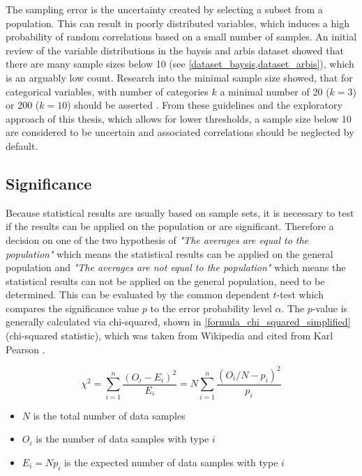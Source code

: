 The sampling error is the uncertainty created by selecting a subset from a population. This can result in poorly distributed variables, which induces a high probability of random correlations based on a small number of samples. An initial review of the variable distributions in the \acrshort{baysis} and \acrshort{arbis} dataset showed that there are many sample sizes below 10 (see \cref{dataset_baysis,dataset_arbis}), which is an arguably low count. Research into the minimal sample size showed, that for categorical variables, with number of categories $k$ a minimal number of 20 ($k=3$) or 200 ($k=10$) should be asserted \parencite{Cicchetti1981}. From these guidelines and the exploratory approach of this thesis, which allows for lower thresholds, a sample size below 10 are considered to be uncertain and associated correlations should be neglected by default.

\subsection{Significance}
\label{correlation_significance}
Because statistical results are usually based on sample sets, it is necessary to test if the results can be applied on the population or are significant. Therefore a decision on one of the two hypothesis of \textit{"The averages are equal to the population"} which means the statistical results can be applied on the general population and \textit{"The averages are not equal to the population"} which means the statistical results can not be applied on the general population, need to be determined. This can be evaluated by the common dependent $t$-test which compares the significance value $p$ to the error probability level $\alpha$. The $p$-value is generally calculated via chi-squared, shown in \cref{formula_chi_squared_simplified} (chi-squared statistic), which was taken from Wikipedia and cited from Karl Pearson \parencite{Pearson1990}.


\begin{equation}
\label{formula_chi_squared_simplified}	
	\chi^2 = \sum_{i=1}^{n}{\frac{(O_i-E_i)^2}{E_i}} = N\sum_{i=1}^{n}{\frac{(O_i/N-p_i)^2}{p_i}}
\end{equation}
\begin{itemize}
	\setlength\itemsep{0.1em}	
	\item[] $N$ is the total number of data samples 
	\item[] $O_i$ is the number of data samples with type $i$
	\item[] $E_i = N p_i$ is the expected number of data samples with type $i$
\end{itemize}

